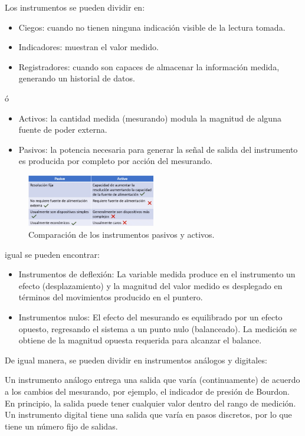 \documentclass[12pt, letterpaper]{extarticle}
\begin{document}
Los instrumentos se pueden dividir en:
\begin{itemize}
    \item Ciegos: cuando no tienen ninguna indicación visible de la lectura tomada.
    \item Indicadores: muestran el valor medido.
    \item Registradores: cuando son capaces de almacenar la información medida, generando un historial de datos.
\end{itemize}

ó
\begin{itemize}
    \item Activos: la cantidad medida (mesurando) modula la magnitud de alguna fuente de poder externa.
    \item Pasivos: la potencia necesaria para generar la señal de salida del instrumento es producida por completo por acción del mesurando.
\end{itemize}

\begin{figure}[h]
    \centering
    \includegraphics[width=0.5\textwidth]{Media/comparacion_pasivo_activo.png}
    \caption{Comparación de los instrumentos pasivos y activos.}
    \label{Fig: Comparacion de los instrumentos pasivos y activos}
\end{figure}

igual se pueden encontrar:
\begin{itemize}
    \item Instrumentos de deflexión: La variable medida produce en el instrumento un efecto (desplazamiento) y la magnitud del valor medido es desplegado en términos del movimientos producido en el puntero.
    \item Instrumentos nulos: El efecto del mesurando es equilibrado por un efecto opuesto, regresando el sistema a un punto nulo (balanceado). La medición se obtiene de la magnitud opuesta requerida para alcanzar el balance.
\end{itemize}

De igual manera, se pueden dividir en instrumentos análogos y digitales:

Un instrumento análogo entrega una salida que varía (continuamente) de acuerdo a los cambios del mesurando, por ejemplo, el indicador de presión de Bourdon. En principio, la salida puede tener cualquier valor dentro del rango de medición. Un instrumento digital tiene una salida que varía en pasos discretos, por lo que tiene un número fijo de salidas.
\end{document}
